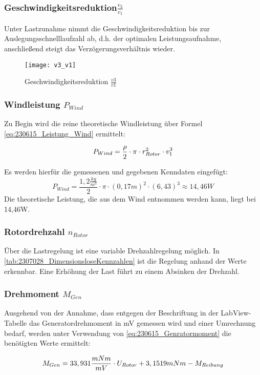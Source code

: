 \subsubsection*{Geschwindigkeitsreduktion$\frac{v_3}{v_1}$}
Unter Lastzunahme nimmt die Geschwindigkeitsreduktion bis zur Auslegungsschnelllaufzahl ab, d.h. der optimalen Leistungsaufnahme, anschließend steigt das Verzögerungsverhältnis wieder.
\begin{figure}[H]
    \centering
    \texttt{[image: v3\_v1]}
    \caption{Geschwindigkeitsreduktion $\frac{v3}{v1}$}
    \label{fig:Geschwindigkeitsreduktion}
\end{figure}

\subsubsection*{Windleistung $P_{Wind}$}
Zu Begin wird die reine theoretische Windleistung über Formel \autoref{eq:230615_Leistung_Wind} ermittelt:

\begin{equation}
    \centering
    P_{Wind} = \frac{\rho}{2} \cdot \pi \cdot r_{Rotor}^2 \cdot v_1^3
    \label{eq:230615_Leistung_Wind}
\end{equation}

Es werden hierfür die gemessenen und gegebenen Kenndaten eingefügt:
$$P_{Wind} = \frac{1,2 \frac{kg}{m^3}}{2} \cdot \pi \cdot (0,17 m)^2 \cdot (6,43)^3 \approx 14,46 W$$
Die theoretische Leistung, die aus dem Wind entnommen werden kann, liegt bei 14,46W.

\subsubsection*{Rotordrehzahl $n_{Rotor}$}
Über die Lastregelung ist eine variable Drehzahlregelung möglich. In \autoref{tab:2307028_DimensionsloseKennzahlen} ist die Regelung anhand der Werte erkennbar. Eine Erhöhung der Last führt zu einem Absinken der Drehzahl.
\subsubsection*{Drehmoment $M_{Gen}$}
Ausgehend von der Annahme,
dass entgegen der Beschriftung in der LabView-Tabelle das Generatordrehmoment in mV gemessen wird und einer Umrechnung bedarf, 
werden unter Verwendung von \autoref{eq:230615_Genratormoment} die benötigten Werte ermittelt:

\begin{equation}
    \centering
    M_{Gen} = 33,931\frac{mNm}{mV} \cdot U_{Rotor} + 3,1519 mNm - M_{Reibung}
    \label{eq:230615_Genratormoment}
\end{equation}

